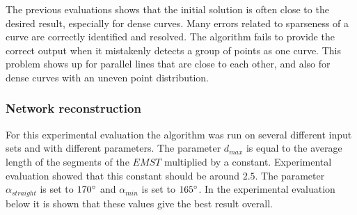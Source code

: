 \documentclass[11pt]{article}
\begin{document}
The previous evaluations shows that the initial solution is often close to the desired result, especially for dense curves. Many errors related to sparseness of a curve are correctly identified and resolved. The algorithm fails to provide the correct output when it mistakenly detects a group of points as one curve. This problem shows up for parallel lines that are close to each other, and also for dense curves with an uneven point distribution.

\subsubsection{Network reconstruction}
For this experimental evaluation the algorithm was run on several different input sets and with different parameters. The parameter $d_{max}$ is equal to the average length of the segments of the $EMST$ multiplied by a constant. Experimental evaluation showed that this constant should be around $2.5$. The parameter $\alpha_{straight}$ is set to $170\degree$ and $\alpha_{min}$ is set to $165\degree$. In the experimental evaluation below it is shown that these values give the best result overall.
\end{document}
